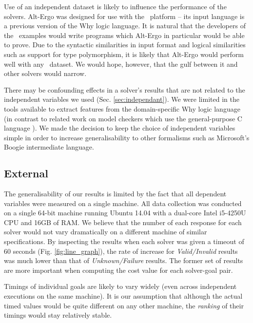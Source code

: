 Use of an independent dataset is likely to influence the performance of the solvers. 
Alt-Ergo was designed for use with the \why~platform -- its input language is a previous version of the Why logic language. 
It is natural that the developers of the \why~examples would write programs which Alt-Ergo in particular would be able to prove. 
Due to the syntactic similarities in input format and logical similarities such as support for type polymorphism, it is likely that Alt-Ergo would perform well with any \why~dataset. We would hope, however, that the gulf between it and other solvers would narrow.

There may be confounding effects in a solver's results that are not related to the independent variables we used (Sec. \ref{sec:independant}). 
We were limited in the tools available to extract features from the domain-specific Why logic language (in contrast to related work on model checkers which use the general-purpose C language \cite{DPVZ15:CAV, MUX}). 
We made the decision to keep the choice of independent variables simple in order to increase generalisability to other formalisms such as Microsoft's Boogie \cite{Boogie} intermediate language.  

\subsection{External}


The generalisability of our results is limited by the fact that all dependent variables were measured on a single machine.
All data collection was conducted on a single 64-bit machine running Ubuntu 14.04 with a dual-core Intel i5-4250U CPU and 16GB of RAM. 
We believe that the number of each response for each solver would not vary dramatically on a different machine of similar specifications. 
By inspecting the results when each solver was given a timeout of 60 seconds (Fig. \ref{fig:line_graph}), the rate of increase for \textit{Valid/Invalid} results was much lower than that of \textit{Unknown/Failure} results. 
The former set of results are more important when computing the cost value for each solver-goal pair.

Timings of individual goals are likely to vary widely (even across independent executions on the same machine).
It is our assumption that although the actual timed values would be quite different on any other machine, the \textit{ranking} of their timings would stay relatively stable.

